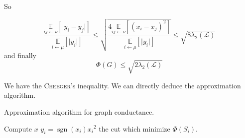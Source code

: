 \documentclass[12pt]{article}
\newcommand{\EE}{\mathbb{E}}
\renewcommand{\L}{\mathcal{L}}
\newcommand{\la}{\leftarrow}
\newcommand{\esp}[2][]{\underset{#1}{\EE}\left[ #2 \right]}
\DeclareMathOperator{\sgn}{sgn}
\begin{document}
So

\[
    \frac{\esp[ij\la\nu]{\lvert y_i-y_j \rvert}}{\esp[i\la\mu]{\lvert y_i \rvert}} \leqslant \sqrt{\frac{4 \esp[ij\la\nu]{(x_i-x_j)^2}}{\esp[i\la\mu]{\lvert y_i \rvert}}} \leqslant\sqrt{8\lambda_2(\L)}
\]
and finally 
\[
    \Phi(G) \leqslant \sqrt{2\lambda_2(\L)}
\]

We have the \textsc{Cheeger}'s inequality. We can directly deduce the approximation algorithm.

\begin{algorithm}[!ht]
    \caption{Approximation algorithm for graph conductance.}
    \DontPrintSemicolon
    Compute $x$\;
    $y_i = \sgn(x_i){x_i}^2$\;
    \Return the cut which minimize $\Phi(S_i)$.
\end{algorithm}



\end{document}
